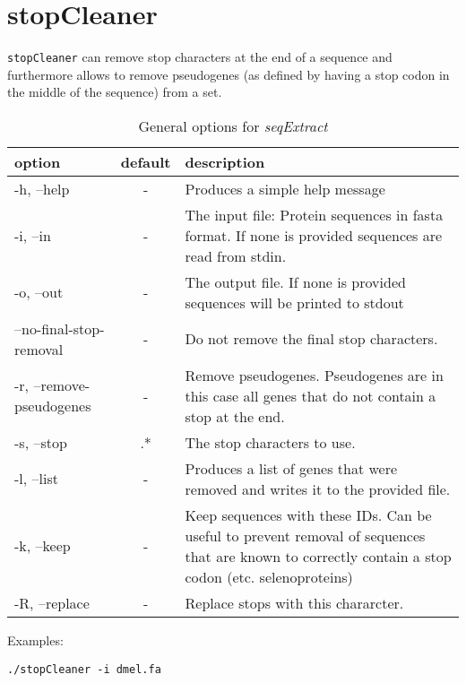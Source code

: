 \chapter{stopCleaner}

\texttt{stopCleaner} can remove stop characters at the end of a sequence and furthermore allows to remove pseudogenes (as defined by having a stop codon in the middle of the sequence) from a set. 

\begin{table}[H]
\caption{General options for \textit{seqExtract}}
\begin{tabular}{lcp{8cm}}\hline
option & default & description\\
\hline
-h, --help & - & Produces a simple help message\\
  -i, --in &-&              The input file: Protein sequences in fasta format. If none is provided sequences are read from stdin.\\
  -o, --out &-&    The output file. If none is provided sequences will be printed to stdout\\
  --no-final-stop-removal  &-&     Do not remove the final stop characters.\\
  -r, --remove-pseudogenes &-&   Remove pseudogenes. Pseudogenes are in this case all genes that do not contain a stop at the end.\\
  -s, --stop   &.*   &      The stop characters to use.\\
  -l, --list  &-&            Produces a list of genes that were removed and writes it to the provided file.\\
  -k, --keep  &-&            Keep sequences with these IDs. Can be useful to prevent removal of sequences that are known to correctly contain a stop codon (etc. selenoproteins)\\
  -R, --replace &-&          Replace stops with this chararcter.\\
  \hline
\end{tabular}
\end{table}


Examples:

\begin{lstlisting}
./stopCleaner -i dmel.fa
\end{lstlisting}
